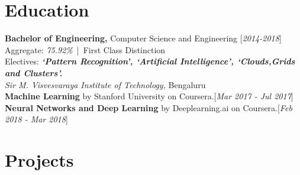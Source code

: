\documentclass[10pt]{article}
\renewcommand{\textbf}[1]{{\bfseries\color{accent_darkest}#1}}
\begin{document}
\section*{Education} \textbf{Bachelor of Engineering,} Computer Science
and Engineering \hfill \textcolor{grey_darker}{[\textit{2014-2018}]}\\
Aggregate: \textit{75.92\%}\ |\ First Class Distinction
\\ Electives: \textbf{\textit{`Pattern Recognition', `Artificial Intelligence',
`Clouds,Grids and Clusters'.}}\\
\textit{Sir M. Visvesvaraya Institute of Technology,} Bengaluru
\medskip
\\
\textbf{Machine Learning} by Stanford University on Coursera.\hfill  \textcolor{grey_darker}{[\textit
{Mar 2017 - Jul 2017}]}
\medskip\\ 
\textbf{Neural Networks and Deep Learning} by Deeplearning.ai on Coursera.\hfill  \textcolor{grey_darker}{[\textit
{Feb 2018 - Mar 2018}]}\\


\section*{Projects}
\end{document}
